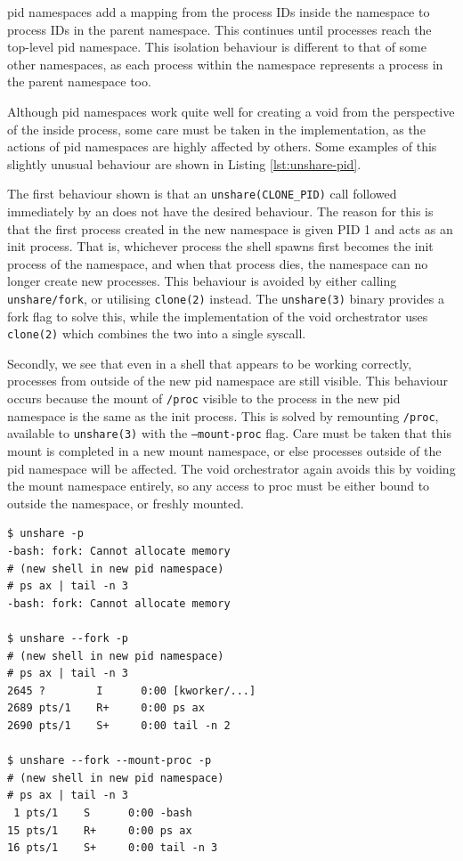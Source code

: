 \documentclass[sigplan]{acmart}
\begin{document}
pid namespaces add a mapping from the process IDs inside the namespace to process IDs in the parent namespace. This continues until processes reach the top-level pid namespace. This isolation behaviour is different to that of some other namespaces, as each process within the namespace represents a process in the parent namespace too.

Although pid namespaces work quite well for creating a void from the perspective of the inside process, some care must be taken in the implementation, as the actions of pid namespaces are highly affected by others. Some examples of this slightly unusual behaviour are shown in Listing \ref{lst:unshare-pid}.

The first behaviour shown is that an \texttt{unshare(CLONE\_PID)} call followed immediately by an  does not have the desired behaviour. The reason for this is that the first process created in the new namespace is given PID 1 and acts as an init process. That is, whichever process the shell spawns first becomes the init process of the namespace, and when that process dies, the namespace can no longer create new processes. This behaviour is avoided by either calling \texttt{unshare/fork}, or utilising \texttt{clone(2)} instead. The \texttt{unshare(3)} binary provides a fork flag to solve this, while the implementation of the void orchestrator uses \texttt{clone(2)} which combines the two into a single syscall.

Secondly, we see that even in a shell that appears to be working correctly, processes from outside of the new pid namespace are still visible. This behaviour occurs because the mount of \texttt{/proc} visible to the process in the new pid namespace is the same as the init process. This is solved by remounting \texttt{/proc}, available to \texttt{unshare(3)} with the \texttt{--mount-proc} flag. Care must be taken that this mount is completed in a new mount namespace, or else processes outside of the pid namespace will be affected. The void orchestrator again avoids this by voiding the mount namespace entirely, so any access to proc must be either bound to outside the namespace, or freshly mounted.

\begin{lstlisting}[float,label={lst:unshare-pid}]
$ unshare -p
-bash: fork: Cannot allocate memory
# (new shell in new pid namespace)
# ps ax | tail -n 3
-bash: fork: Cannot allocate memory

$ unshare --fork -p
# (new shell in new pid namespace)
# ps ax | tail -n 3
2645 ?        I      0:00 [kworker/...]
2689 pts/1    R+     0:00 ps ax
2690 pts/1    S+     0:00 tail -n 2

$ unshare --fork --mount-proc -p
# (new shell in new pid namespace)
# ps ax | tail -n 3
 1 pts/1    S      0:00 -bash
15 pts/1    R+     0:00 ps ax
16 pts/1    S+     0:00 tail -n 3

\end{lstlisting}
\end{document}
